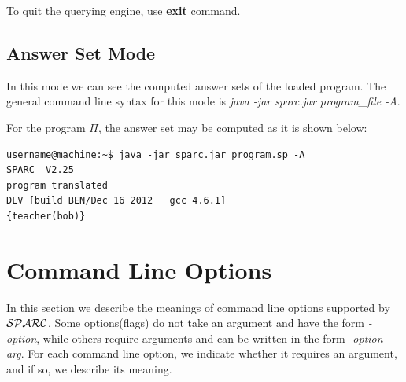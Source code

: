 \documentclass[12pt, letterpaper]{article}
\begin{document}
To quit the querying engine, use \textbf{exit} command.

\subsection{Answer Set Mode}

In this mode we can see the computed answer sets of the loaded program.
The general command line syntax for this mode is \textit{java -jar sparc.jar program\_file -A}.

For the program $\Pi$, the answer set may be computed as it is shown below:
\begin{verbatim}
username@machine:~$ java -jar sparc.jar program.sp -A
SPARC  V2.25
program translated
DLV [build BEN/Dec 16 2012   gcc 4.6.1]
{teacher(bob)}

\end{verbatim}

\section{Command Line Options}\label{option}

In this section we  describe the meanings of command line options supported by
${\cal SPARC}$. Some options(flags) do not take an argument and have the form \textit{-option},
while others require arguments and can be written in the form \textit{-option arg}.
For each command line option, we indicate whether it requires
an argument, and if so, we  describe its meaning.
\end{document}
